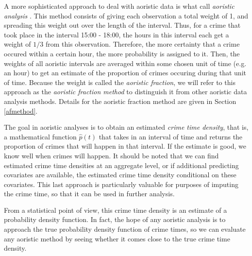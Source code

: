A more sophisticated approach to deal with aoristic data is what \citet{ashby2013comparison} call \textit{aoristic analysis} \citep{ratcliffe1998aoristic, ratcliffe2000aoristic}. This method consists of giving each observation a total weight of 1, and spreading this weight out over the length of the interval. Thus, for a crime that took place in the interval 15:00 - 18:00, the hours in this interval each get a weight of $1/3$ from this observation. Therefore, the more certainty that a crime occured within a certain hour, the more probability is assigned to it. Then, the weights of all aoristic intervals are averaged within some chosen unit of time (e.g. an hour) to get an estimate of the proportion of crimes occuring during that unit of time. Because the weight is called the \textit{aoristic fraction}, we will refer to this approach as the \textit{aoristic fraction method} to distinguish it from other aoristic data analysis methods. Details for the aoristic fraction method are given in Section \ref{afmethod}.

The goal in  aoristic analyses is to obtain an estimated \textit{crime time density}, that is, a mathematical function $\hat{p}(t)$ that takes in an interval of time and returns the proportion of crimes that will happen in that interval. If the estimate is good, we know well when crimes will happen. It should be noted that we can find estimated crime time densities at an aggregate level, or if additional predicting covariates are available, the estimated crime time density conditional on these covariates. This last approach is particularly valuable for purposes of imputing the crime time, so that it can be used in further analysis.

From a statistical point of view, this crime time density is an estimate of a probability density function. In fact, the hope of any aoristic analysis is to approach the true probability density function of crime times, so we can evaluate any aoristic method by seeing whether it comes close to the true crime time density.



